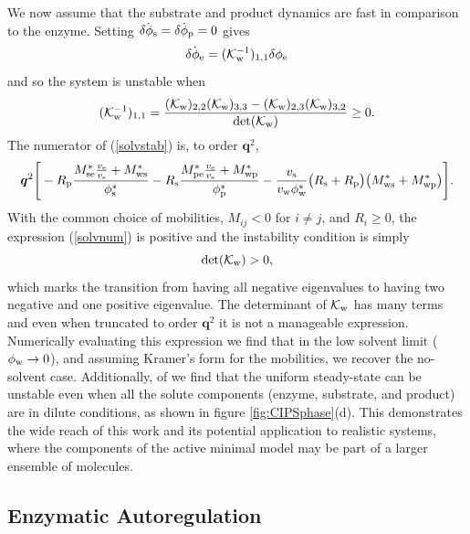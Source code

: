 We now assume that the substrate and product dynamics are fast in comparison to the enzyme. Setting $\dot{\delta\phi_{\mathrm{s}}}=\dot{\delta\phi_{\mathrm{p}}}=0$ gives
\begin{equation}
    \dot{\delta\phi_{\mathrm{e}}} = ({\cal K}_{\rm w}^{-1})_{1, 1}\delta\phi_{\mathrm{e}}
\end{equation}
and so the system is unstable when
\begin{equation}
    ({\cal K}_{\rm w}^{-1})_{1, 1} = \frac{({\cal K}_{\rm w})_{2, 2}({\cal K}_{\rm w})_{3, 3}-({\cal K}_{\rm w})_{2, 3}({\cal K}_{\rm w})_{3, 2}}{\det({\cal K}_{\rm w})} \geq 0.
    \label{solvstab}
\end{equation}
The numerator of (\ref{solvstab}) is, to order $\bm{q}^2$,
\begin{equation}
    \bm{q}^2\Bigg[-R_\mathrm{p} \frac{M_{\mathrm{se}}^*\frac{v_{\mathrm{e}}}{v_{\mathrm{s}}}+M_{\mathrm{ws}}^*}{\phi_{\mathrm{s}}^*}-R_\mathrm{s} \frac{M_{\mathrm{pe}}^*\frac{v_{\mathrm{e}}}{v_{\mathrm{s}}}+M_{\mathrm{wp}}^*}{\phi_{\mathrm{p}}^*}-\frac{v_{\mathrm{s}}}{v_{\mathrm{w}}\phi_{\mathrm{w}}^*}\big(R_\mathrm{s} +R_\mathrm{p} \big)\big(M_{\mathrm{ws}}^*+M_{\mathrm{wp}}^*\big)\Bigg].
    \label{solvnum}
\end{equation}
With the common choice of mobilities, $M_{ij}<0$ for $i \neq j$, and $R_i \geq 0$, the expression (\ref{solvnum}) is positive and the instability condition is simply
\begin{equation}
    \det({\cal K}_{\rm w}) > 0,
\end{equation}
which marks the transition from having all negative eigenvalues to having two negative and one positive eigenvalue. The determinant of ${\cal{K}}_{\rm w}$ has many terms and even when truncated to order $\bm{q}^2$ it is not a manageable expression. Numerically evaluating this expression we find that in the low solvent limit ($\phi_{\mathrm{w}} \to 0$), and assuming Kramer's form for the mobilities, we recover the no-solvent case. Additionally, of we find that the uniform steady-state can be unstable even when all the solute components (enzyme, substrate, and product) are in dilute conditions, as shown in figure \ref{fig:CIPSphase}(d). This demonstrates the wide reach of this work and its potential application to realistic systems, where the components of the active minimal model may be part of a larger ensemble of molecules.

\subsection{Enzymatic Autoregulation}

